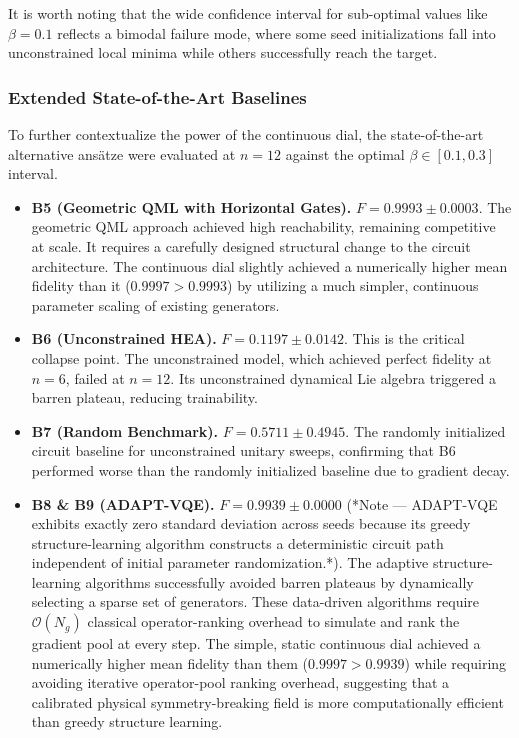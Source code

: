 \documentclass[10pt,twocolumn]{article}
\theoremstyle{remark}
\begin{document}
It is worth noting that the wide confidence interval for sub-optimal values like $\beta=0.1$ reflects a bimodal failure mode, where some seed initializations fall into unconstrained local minima while others successfully reach the target.

\subsubsection{Extended State-of-the-Art Baselines}
To further contextualize the power of the continuous dial, the state-of-the-art alternative ans\"atze were evaluated at $n=12$ against the optimal $\beta \in [0.1, 0.3]$ interval.
\begin{itemize}
    \item \textbf{B5 (Geometric QML with Horizontal Gates).} $F=0.9993 \pm 0.0003$. The geometric QML approach achieved high reachability, remaining competitive at scale. It requires a carefully designed structural change to the circuit architecture. The continuous dial slightly achieved a numerically higher mean fidelity than it ($0.9997 > 0.9993$) by utilizing a much simpler, continuous parameter scaling of existing generators.
    \item \textbf{B6 (Unconstrained HEA).} $F=0.1197 \pm 0.0142$. This is the critical collapse point. The unconstrained model, which achieved perfect fidelity at $n=6$, failed at $n=12$. Its unconstrained dynamical Lie algebra triggered a barren plateau, reducing trainability.
    \item \textbf{B7 (Random Benchmark).} $F=0.5711 \pm 0.4945$. The randomly initialized circuit baseline for unconstrained unitary sweeps, confirming that B6 performed worse than the randomly initialized baseline due to gradient decay.
    \item \textbf{B8 \& B9 (ADAPT-VQE).} $F=0.9939 \pm 0.0000$ (*Note --- ADAPT-VQE exhibits exactly zero standard deviation across seeds because its greedy structure-learning algorithm constructs a deterministic circuit path independent of initial parameter randomization.*). The adaptive structure-learning algorithms successfully avoided barren plateaus by dynamically selecting a sparse set of generators. These data-driven algorithms require $\mathcal{O}(N_g)$ classical operator-ranking overhead to simulate and rank the gradient pool at every step. The simple, static continuous dial achieved a numerically higher mean fidelity than them ($0.9997 > 0.9939$) while requiring avoiding iterative operator-pool ranking overhead, suggesting that a calibrated physical symmetry-breaking field is more computationally efficient than greedy structure learning.
\end{itemize}
\end{document}
